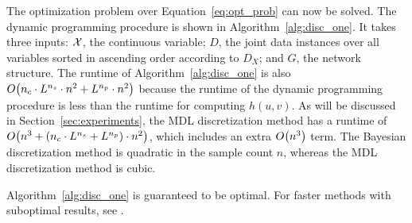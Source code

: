 The optimization problem over Equation~\ref{eq:opt_prob} can now be solved.
The dynamic programming procedure is shown in Algorithm~\ref{alg:disc_one}.
It takes three inputs: $\mathcal{X}$, the continuous variable; $D$, the joint data instances over all variables sorted in ascending order according to $D_X$; and $G$, the network structure.
The runtime of Algorithm~\ref{alg:disc_one} is also $\bigo \paren{ n_c \cdot {L}^{n_s} \cdot n^2 + {L}^{n_p} \cdot n^2 }$ because the runtime of the dynamic programming procedure is less than the runtime for computing $h(u,v)$.
As will be discussed in Section~\ref{sec:experiments}, the MDL discretization method has a runtime of $\bigo\paren{ n^3 + \paren{ n_c \cdot {L}^{n_s} + {L}^{n_p}} \cdot n^2 }$, which includes an extra $\bigo\paren{ n^3}$ term.
The Bayesian discretization method is quadratic in the sample count $n$, whereas the MDL discretization method is cubic.

Algorithm~\ref{alg:disc_one} is guaranteed to be optimal.
For faster methods with suboptimal results, see \citet{Boulle_2006}.

